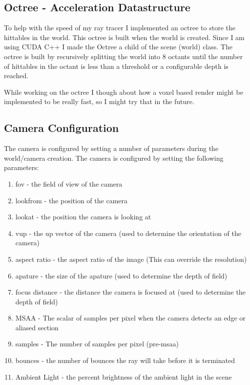 \documentclass{article}
\begin{document}
    \subsection{Octree - Acceleration Datastructure} 
    To help with the speed of my ray tracer I implemented an octree to store the hittables in the world. This octree is built when the world is created. Since I am using CUDA C++ I made the Octree a child of the scene (world) class. The octree is built by recursively splitting the world into 8 octants until the number of hittables in the octant is less than a threshold or a configurable depth is reached. \par 
    While working on the octree I though about how a voxel based render might be implemented to be really fast, so I might try that in the future. \par   




    \subsection{Camera Configuration}
    The camera is configured by setting a number of parameters during the world/camera creation. The camera is configured by setting the following parameters: \par
    \begin{enumerate}
        \item fov - the field of view of the camera
        \item lookfrom - the position of the camera
        \item lookat - the position the camera is looking at
        \item vup - the up vector of the camera (used to determine the orientation of the camera)
        \item aspect ratio - the aspect ratio of the image (This can override the resolution)
        \item apature - the size of the apature (used to determine the depth of field)
        \item focus distance - the distance the camera is focused at (used to determine the depth of field)
        \item MSAA - The scalar of samples per pixel when the camera detects an edge or aliased section 
        \item samples - The number of samples per pixel (pre-msaa)
        \item bounces - the number of bounces the ray will take before it is terminated
        \item Ambient Light - the percent brightness of the ambient light in the scene 
    \end{enumerate}
\end{document}
